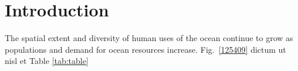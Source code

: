 \section{Introduction}
\label{introduction}

The spatial extent and diversity of human uses of the ocean continue to grow as populations and demand for ocean resources increase. Fig.~\ref{125409} dictum ut nisl et Table \ref{tab:table}
